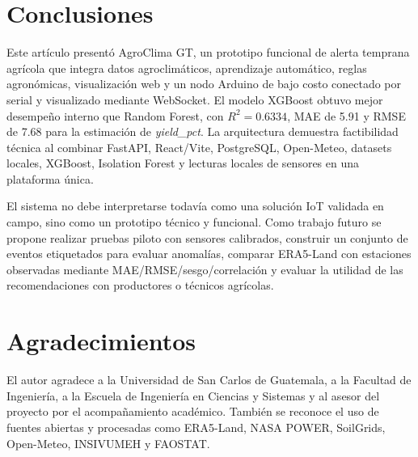 \documentclass[conference,a4paper]{IEEEtran}
\begin{document}
\section{Conclusiones}
Este artículo presentó AgroClima GT, un prototipo funcional de alerta temprana agrícola que integra datos agroclimáticos, aprendizaje automático, reglas agronómicas, visualización web y un nodo Arduino de bajo costo conectado por serial y visualizado mediante WebSocket. El modelo XGBoost obtuvo mejor desempeño interno que Random Forest, con $R^2=0.6334$, MAE de 5.91 y RMSE de 7.68 para la estimación de \textit{yield\_pct}. La arquitectura demuestra factibilidad técnica al combinar FastAPI, React/Vite, PostgreSQL, Open-Meteo, datasets locales, XGBoost, Isolation Forest y lecturas locales de sensores en una plataforma única.

El sistema no debe interpretarse todavía como una solución IoT validada en campo, sino como un prototipo técnico y funcional. Como trabajo futuro se propone realizar pruebas piloto con sensores calibrados, construir un conjunto de eventos etiquetados para evaluar anomalías, comparar ERA5-Land con estaciones observadas mediante MAE/RMSE/sesgo/correlación y evaluar la utilidad de las recomendaciones con productores o técnicos agrícolas.

\section*{Agradecimientos}
El autor agradece a la Universidad de San Carlos de Guatemala, a la Facultad de Ingeniería, a la Escuela de Ingeniería en Ciencias y Sistemas y al asesor del proyecto por el acompañamiento académico. También se reconoce el uso de fuentes abiertas y procesadas como ERA5-Land, NASA POWER, SoilGrids, Open-Meteo, INSIVUMEH y FAOSTAT.
\end{document}
